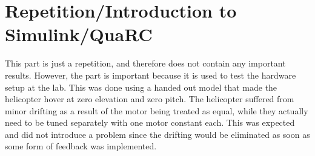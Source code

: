 \section{Repetition/Introduction to Simulink/QuaRC}\label{sec:prob1}

This part is just a repetition, and therefore does not contain any important results. However, the part is important because it is used to test the hardware setup at the lab. This was done using a handed out model that made the helicopter hover at zero elevation and zero pitch. The helicopter suffered from minor drifting as a result of the motor being treated as equal, while they actually need to be tuned separately with one motor constant each. This was expected and did not introduce a problem since the drifting would be eliminated as soon as some form of feedback was implemented.